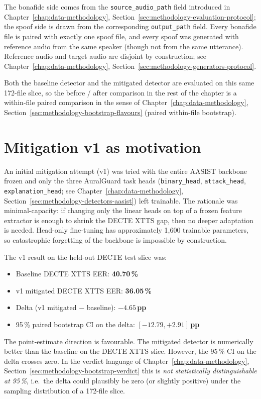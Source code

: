The bonafide side comes from the \texttt{source\_audio\_path} field
introduced in Chapter~\ref{chap:data-methodology}, Section~\ref{sec:methodology-evaluation-protocol}; the spoof side is drawn
from the corresponding \texttt{output\_path} field. Every bonafide file
is paired with exactly one spoof file, and every spoof was
generated with reference audio from the same speaker (though not
from the same utterance). Reference audio and target audio are
disjoint by construction; see Chapter~\ref{chap:data-methodology}, Section~\ref{sec:methodology-generators-protocol}.

Both the baseline detector and the mitigated detector are
evaluated on this same 172-file slice, so the before / after
comparison in the rest of the chapter is a within-file paired
comparison in the sense of Chapter~\ref{chap:data-methodology}, Section~\ref{sec:methodology-bootstrap-flavours} (paired
within-file bootstrap).


\section{Mitigation v1 as motivation}
\label{sec:mitigation-v1}

An initial mitigation attempt (v1) was tried with the entire
AASIST backbone frozen and only the three AuralGuard task heads
(\texttt{binary\_head}, \texttt{attack\_head}, \texttt{explanation\_head};
see Chapter~\ref{chap:data-methodology},
Section~\ref{sec:methodology-detectors-aasist}) left trainable.
The rationale was minimal-capacity: if changing only the linear
heads on top of a frozen feature extractor is enough to shrink
the DECTE XTTS gap, then no deeper adaptation is needed.
Head-only fine-tuning has approximately 1,600 trainable
parameters, so catastrophic forgetting of the backbone is
impossible by construction.

The v1 result on the held-out DECTE test slice was:

\begin{itemize}
    \item Baseline DECTE XTTS EER: \textbf{40.70\,\%}
    \item v1 mitigated DECTE XTTS EER: \textbf{36.05\,\%}
    \item Delta (v1 mitigated $-$ baseline): $\mathbf{-4.65}$\,\textbf{pp}
    \item 95\,\% paired bootstrap CI on the delta: $\mathbf{[-12.79, +2.91]}$\,\textbf{pp}
\end{itemize}

The point-estimate direction is favourable. The mitigated detector
is numerically better than the baseline on the DECTE XTTS slice.
However, the 95\,\% CI on the delta crosses zero. In the verdict
language of Chapter~\ref{chap:data-methodology}, Section~\ref{sec:methodology-bootstrap-verdict} this is
\emph{not statistically distinguishable at 95\,\%}, i.e.\ the delta
could plausibly be zero (or slightly positive) under the sampling
distribution of a 172-file slice.

